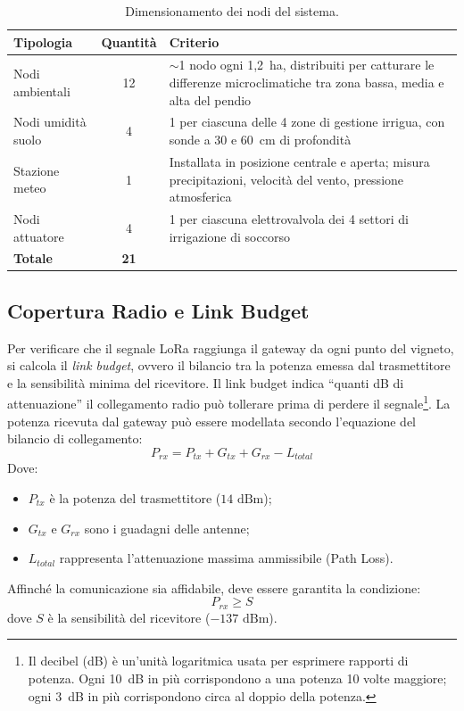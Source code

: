 \begin{table}[H]
    \centering
    \small
    \begin{tabularx}{\textwidth}{|l|c|X|}
        \hline
        \textbf{Tipologia} & \textbf{Quantità} & \textbf{Criterio} \\
        \hline
        Nodi ambientali & 12 & $\sim$1 nodo ogni 1,2~ha, distribuiti per catturare le differenze microclimatiche tra zona bassa, media e alta del pendio \\
        \hline
        Nodi umidità suolo & 4 & 1 per ciascuna delle 4 zone di gestione irrigua, con sonde a 30 e 60~cm di profondità \\
        \hline
        Stazione meteo & 1 & Installata in posizione centrale e aperta; misura precipitazioni, velocità del vento, pressione atmosferica \\
        \hline
        Nodi attuatore & 4 & 1 per ciascuna elettrovalvola dei 4 settori di irrigazione di soccorso \\
        \hline
        \textbf{Totale} & \textbf{21} & \\
        \hline
    \end{tabularx}
    \caption{Dimensionamento dei nodi del sistema.}
    \label{tab:dimensionamento_nodi}
\end{table}

\subsection{Copertura Radio e Link Budget}

Per verificare che il segnale LoRa raggiunga il gateway da ogni punto del vigneto, si calcola il \textit{link budget}, ovvero il bilancio tra la potenza emessa dal trasmettitore e la sensibilità minima del ricevitore. Il link budget indica ``quanti dB di attenuazione'' il collegamento radio può tollerare prima di perdere il segnale\footnote{Il decibel (dB) è un'unità logaritmica usata per esprimere rapporti di potenza. Ogni 10~dB in più corrispondono a una potenza 10 volte maggiore; ogni 3~dB in più corrispondono circa al doppio della potenza.}.
La potenza ricevuta dal gateway può essere modellata secondo l'equazione del bilancio di collegamento:
$$P_{rx} = P_{tx} + G_{tx} + G_{rx} - L_{total}$$
Dove:
\begin{itemize}
	\item $P_{tx}$ è la potenza del trasmettitore ($14\text{ dBm}$);
	\item $G_{tx}$ e $G_{rx}$ sono i guadagni delle antenne;
	\item $L_{total}$ rappresenta l'attenuazione massima ammissibile (Path Loss).
\end{itemize}
Affinché la comunicazione sia affidabile, deve essere garantita la condizione:
\begin{equation}
	P_{rx} \geq S
\end{equation}
\noindent dove $S$ è la sensibilità del ricevitore ($-137\text{ dBm}$).\newline

